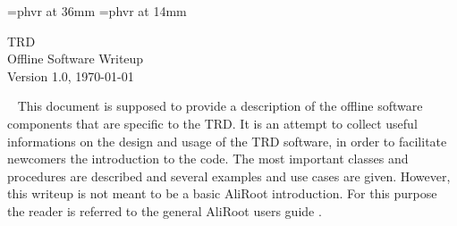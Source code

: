 \documentclass{alicetdr}
\begin{document}
%
%
%
%
\font\HUGEA=phvr at 36mm  %
\font\HUGEB=phvr at 14mm  %
%
\begin{titlepage}
%
\vspace{10.0cm}
%
\begin{center}
{\HUGEA T\hspace{5.mm}R\hspace{5.mm}D} \\
%
\vspace{3.5cm}
{\HUGEB Offline Software Writeup} \\
%
\vspace{2.0cm}
{\Large Version 1.0, \today}\\
%
\vfill
%
\vspace{5.5cm}
%
\end{center}
%
\end{titlepage}
%
%
%
\onecolumn
\thispagestyle{empty}
\mbox{  }
%
\setcounter{page}{0}
\onecolumn
%
%
%
%
%
%
\thispagestyle{empty}
\tableofcontents
%
%
%
%
\newpage
\setcounter{chapter}{0}
\setcounter{section}{0}    
\thispagestyle{empty}
%
This document is supposed to provide a description of the offline
software components that are specific to the TRD.  It is an attempt
to collect useful informations on the design and usage of the TRD
software, in order to facilitate newcomers the introduction to the
code.  The most important classes and procedures are described and
several examples and use cases are given.
However, this writeup is not meant to be a basic AliRoot introduction.  
For this purpose the reader is referred to the general AliRoot users 
guide \cite{ALIROOT}. 
%
\newpage
\setcounter{chapter}{1}
\setcounter{section}{0}    
\thispagestyle{empty}
%
\end{document}
